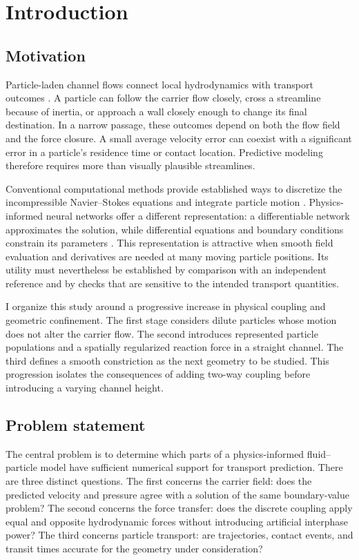 \chapter{Introduction}\label{ch:introduction}

\section{Motivation}
Particle-laden channel flows connect local hydrodynamics with transport
outcomes \citep{balachandar2010,subramaniam2013}. %
 A particle can follow the carrier flow closely, cross a streamline
because of inertia, or approach a wall closely enough to change its final
destination. In a narrow passage, these outcomes depend on both the flow
field and the force closure. A small average velocity error can coexist
with a significant error in a particle's residence time or contact location.
Predictive modeling therefore requires more than visually plausible
streamlines.

Conventional computational methods provide established ways to discretize
the incompressible Navier--Stokes equations and integrate particle motion
\citep{ferziger2002,clift1978}. Physics-informed neural networks offer a
different representation: a differentiable network approximates the
solution, while differential equations and boundary conditions constrain
its parameters \citep{raissi2019,karniadakis2021,cai2021,cuomo2022}. %
 This representation is
attractive when smooth field evaluation and derivatives are needed at
many moving particle positions. Its utility must nevertheless be established
by comparison with an independent reference and by checks that are sensitive
to the intended transport quantities.

I organize this study around a progressive increase in physical coupling
and geometric confinement. The first stage considers dilute particles whose
motion does not alter the carrier flow. The second introduces represented
particle populations and a spatially regularized reaction force in a straight
channel. The third defines a smooth constriction as the next geometry to be
studied. This progression isolates the consequences of adding two-way
coupling before introducing a varying channel height.

\section{Problem statement}
The central problem is to determine which parts of a physics-informed
fluid--particle model have sufficient numerical support for transport
prediction. There are three distinct questions. The first concerns the
carrier field: does the predicted velocity and pressure agree with a solution
of the same boundary-value problem? The second concerns the force transfer:
does the discrete coupling apply equal and opposite hydrodynamic forces
without introducing artificial interphase power? The third concerns
particle transport: are trajectories, contact events, and transit times
accurate for the geometry under consideration?

